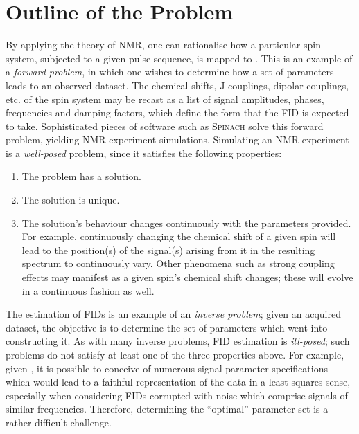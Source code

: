 \section{Outline of the Problem}
\label{sec:theory-outline}
By applying the theory of \ac{NMR}, one can
rationalise how a particular spin system, subjected to a given pulse sequence,
is mapped to . This is an example of a \emph{forward problem},
in which one wishes to determine how a set of parameters leads to an
observed dataset.
The chemical shifts, J-couplings, dipolar couplings, etc. of the spin system
may be recast as a list of signal amplitudes, phases, frequencies and
damping factors, which define the form that the \ac{FID} is expected to take.
Sophisticated pieces of software such as \textsc{Spinach}\cite{Hogben2011}
solve this forward problem, yielding \ac{NMR} experiment simulations.
Simulating an \ac{NMR} experiment is a \emph{well-posed} problem, since it
satisfies the following properties:
\begin{enumerate}
    \item The problem has a solution.
    \item The solution is unique.
    \item The solution's behaviour changes continuously with the parameters
        provided. For example, continuously changing the chemical shift of a
        given spin will lead to the position(s) of the signal(s) arising from
        it in the resulting spectrum to continuously vary. Other phenomena such
        as strong coupling effects may manifest as a given spin's chemical
        shift changes; these will evolve in a continuous fashion as well.
\end{enumerate}
The estimation of \acp{FID} is an example of an \emph{inverse problem};
given an acquired dataset, the objective is to determine the set of parameters
which went into constructing it.
As with many inverse problems, \ac{FID} estimation is
\emph{ill-posed}\cite{Kabanikhin2008}; such problems do not satisfy at least
one of the three properties above. For example, given , it is possible
to conceive of numerous signal parameter specifications which would lead to a
faithful representation of the data in a least squares sense, especially when
considering \acp{FID} corrupted with noise which comprise signals of similar
frequencies. Therefore, determining the ``optimal'' parameter set is a rather
difficult challenge.

